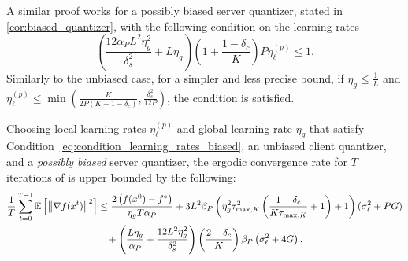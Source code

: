 A similar proof works for a possibly biased server quantizer, stated in \cref{cor:biased_quantizer}, with the following condition on the learning rates
\begin{equation}\label{eq:condition_learning_rates_biased}
    \left(\frac{12 \alpha_P L^2 \eta_g^2}{\delta_s^2} + L \eta_g \right) \left(1 + \frac{1-\delta_c}{K}\right)P \eta^{(p)}_{\ell} \leq 1.
\end{equation}
Similarly to the unbiased case, for a simpler and less precise bound, if $\eta_g \leq \tfrac{1}{L}$ and $\eta_{\ell}^{(p)} \leq \min \left( \tfrac{K}{2P(K+1-\delta_c)}, \tfrac{\delta_s^2}{12P} \right)$, the condition is satisfied.

\begin{corollary} \label{cor:biased_quantizer}
    Choosing local learning rates $\eta_{\ell}^{(p)}$ and global learning rate $\eta_g$ that satisfy Condition~\eqref{eq:condition_learning_rates_biased}, an unbiased client quantizer, and a \emph{possibly biased} server quantizer, the ergodic convergence rate for $T$ iterations of \algname{} is upper bounded by the following:
    \begin{multline}
        \frac{1}{T} \sum_{t=0}^{T-1} \mathbb{E}\left[\left\lVert\nabla f(x^t)\right\rVert^2\right] \leq \frac{2\left(f(x^0) - f^* \right)}{\eta_g T \alpha_P} + 3 L^2 \beta_P \left( \eta^2_g \tau_{\max,K}^2 \left( \frac{1-\delta_c}{K \tau_{\max, K}} + 1 \right) + 1 \right)  (\sigma_{\ell}^2 + PG) \\
        {} +  \left(\frac{L \eta_g}{\alpha_P} +  \frac{12L^2 \eta_g^2}{\delta_s^2} \right) \left(\frac{2-\delta_c}{K}\right)\beta_P \left(\sigma_{\ell}^2 + 4G\right).
    \end{multline}
\end{corollary}

